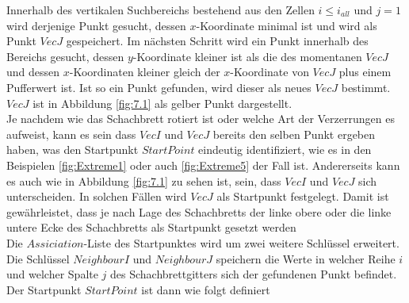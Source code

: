 Innerhalb des vertikalen Suchbereichs bestehend aus den Zellen  $i \leq i_{all}$ und $j = 1$ wird derjenige Punkt gesucht, dessen $x$-Koordinate minimal ist und wird als Punkt $VecJ$ gespeichert. Im nächsten Schritt wird ein Punkt innerhalb des Bereichs gesucht, dessen $y$-Koordinate kleiner ist als die des momentanen $VecJ$ und dessen $x$-Koordinaten kleiner gleich der $x$-Koordinate von $VecJ$ plus einem Pufferwert ist. Ist so ein Punkt gefunden, wird dieser als neues $VecJ$ bestimmt. $VecJ$ ist in Abbildung \ref{fig:7.1} als gelber Punkt dargestellt.\\

%

Je nachdem wie das Schachbrett rotiert ist oder welche Art der Verzerrungen es aufweist, kann es sein dass $VecI$ und $VecJ$ bereits den selben Punkt ergeben haben, was den Startpunkt $StartPoint$ eindeutig identifiziert, wie es in den  Beispielen \ref{fig:Extreme1} oder auch \ref{fig:Extreme5} der Fall ist. Andererseits kann es auch wie in Abbildung \ref{fig:7.1} zu sehen ist, sein, dass $VecI$ und $VecJ$ sich unterscheiden. In solchen Fällen wird $VecJ$ als Startpunkt festgelegt. Damit ist gewährleistet, dass je nach Lage des Schachbretts der linke obere oder die linke untere Ecke des Schachbretts als Startpunkt gesetzt werden\\

Die $Assiciation$-Liste des Startpunktes wird um zwei weitere Schlüssel erweitert. Die Schlüssel $NeighbourI$ und $NeighbourJ$ speichern die Werte in welcher Reihe $i$ und welcher Spalte $j$ des Schachbrettgitters sich der gefundenen Punkt befindet. Der Startpunkt $StartPoint$ ist dann wie folgt definiert



